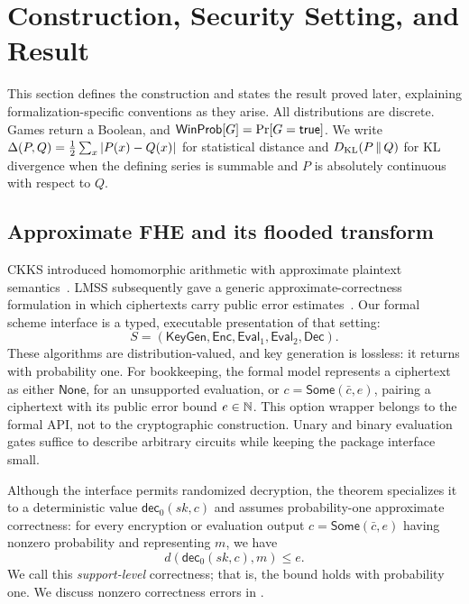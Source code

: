 \section{Construction, Security Setting, and Result}
\label{sec:security-model}

This section defines the construction and states the result proved later,
explaining formalization-specific conventions as they arise.
All distributions are discrete.
Games return a Boolean, and
\(\mathsf{WinProb}[G]=\Pr[G=\mathsf{true}]\).
We write
\(\Delta(P,Q)=\tfrac12\sum_x|P(x)-Q(x)|\) for statistical distance and
\(D_{\mathrm{KL}}\!\left(P\,\|\,Q\right)\) for KL divergence when the defining series is summable and
\(P\) is absolutely continuous with respect to \(Q\).

\subsection{Approximate FHE and its flooded transform}
\label{sec:construction}

CKKS introduced homomorphic arithmetic with approximate plaintext
semantics~\cite{ckks}.
LMSS subsequently gave a generic approximate-correctness formulation in which
ciphertexts carry public error estimates~\cite{lmss}.
Our formal scheme interface is a typed, executable presentation of that
setting:
\[
 S=(\mathsf{KeyGen},\mathsf{Enc},\mathsf{Eval}_1,
       \mathsf{Eval}_2,\mathsf{Dec}).
\]
These algorithms are distribution-valued, and key generation is lossless: it
returns with probability one.
For bookkeeping, the formal model represents a ciphertext as either
\(\mathsf{None}\), for an unsupported evaluation, or
\(c=\mathsf{Some}(\bar c,e)\), pairing a ciphertext with its public error bound
\(e\in\mathbb{N}\).
This option wrapper belongs to the formal API, not to the cryptographic
construction.
Unary and binary evaluation gates suffice to describe arbitrary circuits while
keeping the package interface small.

Although the interface permits randomized decryption, the theorem specializes
it to a deterministic value \(\mathsf{dec}_0(sk,c)\) and assumes
probability-one approximate correctness:
for every encryption or evaluation output
\(c=\mathsf{Some}(\bar c,e)\) having nonzero probability and representing
\(m\), we have
\begin{equation}
\label{eq:approx-correctness}
 d(\mathsf{dec}_0(sk,c),m)\leq e.
\end{equation}
We call this \emph{support-level} correctness;
that is, the bound holds with probability one.
We discuss nonzero correctness errors in .

